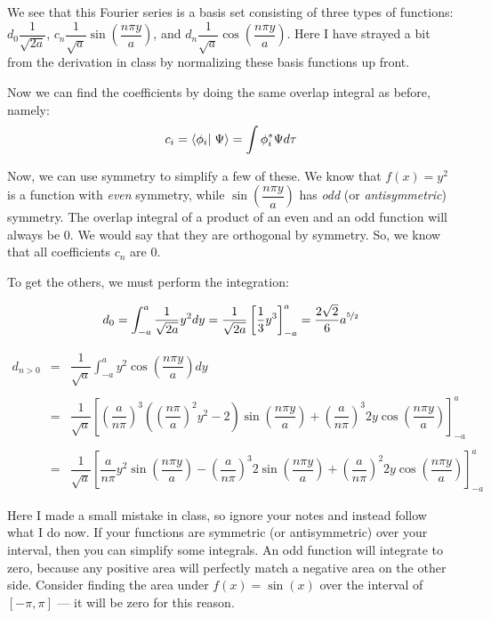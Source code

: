 \documentclass[12pt, openany, letterpaper]{memoir}
\begin{document}
We see that this Fourier series is a basis set consisting of three types of functions: $d_0\dfrac{1}{\sqrt{2a}}$, $c_n\dfrac{1}{\sqrt{a}}\sin\left(\dfrac{n\pi y}{a}\right)$, and $d_n\dfrac{1}{\sqrt{a}}\cos\left(\dfrac{n\pi y}{a}\right)$. Here I have strayed a bit from the derivation in class by normalizing these basis functions up front.

Now we can find the coefficients by doing the same overlap integral as before, namely:
\begin{equation*}
	c_i = \braket{\phi_i}{\Psi} = \int{\phi_i^*\Psi d\tau}
\end{equation*}

Now, we can use symmetry to simplify a few of these. We know that $f(x)=y^2$ is a function with \emph{even} symmetry, while $\sin\left(\dfrac{n\pi y}{a}\right)$ has \emph{odd} (or \emph{antisymmetric}) symmetry. The overlap integral of a product of an even and an odd function will always be 0. We would say that they are orthogonal by symmetry.  So, we know that all coefficients $c_n$ are 0.

To get the others, we must perform the integration:

\begin{equation*}
	d_0=\int_{-a}^{a}\dfrac{1}{\sqrt{2a}}y^2dy=\dfrac{1}{\sqrt{2a}}\left[\frac{1}{3}y^3\right]_{-a}^{a} = \frac{2\sqrt{2}}{6}a^{\nicefrac{5}{2}}
\end{equation*}

\begin{equation*}
\begin{array}{rcl}
	d_{n>0} &=& \dfrac{1}{\sqrt{a}}\int_{-a}^{a}y^2\cos\left(\dfrac{n\pi y}{a}\right)dy\\ \\
	
	&=&\dfrac{1}{\sqrt{a}}\left[\left(\dfrac{a}{n\pi}\right)^3\left(\left(\dfrac{n\pi}{a}\right)^2y^2-2\right)\sin{\left(\dfrac{n\pi y}{a}\right)}+\left(\dfrac{a}{n\pi}\right)^3 2y \cos{\left(\dfrac{n\pi y}{a}\right)}\right]_{-a}^{a}\\ \\
	
	&=&\dfrac{1}{\sqrt{a}}\left[\dfrac{a}{n\pi}y^2\sin{\left(\dfrac{n\pi y}{a}\right)} - \left(\dfrac{a}{n\pi}\right)^3 2\sin{\left(\dfrac{n\pi y}{a}\right)}+\left(\dfrac{a}{n\pi}\right)^2 2y \cos{\left(\dfrac{n\pi y}{a}\right)}\right]_{-a}^{a}
\end{array}
\end{equation*}

Here I made a small mistake in class, so ignore your notes and instead follow what I do now. If your functions are symmetric (or antisymmetric) over your interval, then you can simplify some integrals. An odd function will integrate to zero, because any positive area will perfectly match a negative area on the other side. Consider finding the area under $f(x) = \sin(x)$ over the interval of $[-\pi,\pi]$ --- it will be zero for this reason.
\end{document}
